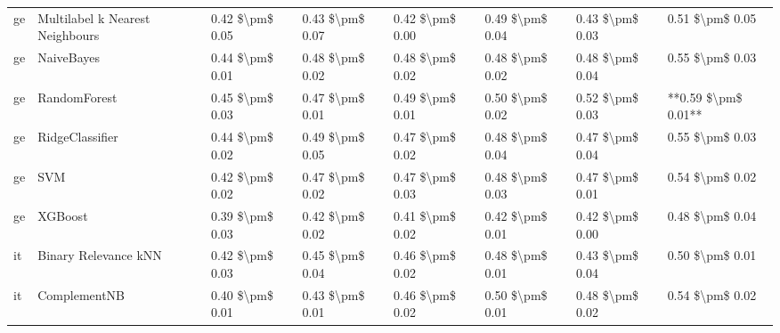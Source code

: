 \begin{tabular}{llllllll}
      ge & Multilabel k Nearest Neighbours & 0.42 \$\textbackslash pm\$ 0.05 &           0.43 \$\textbackslash pm\$ 0.07 &       0.42 \$\textbackslash pm\$ 0.00 &        0.49 \$\textbackslash pm\$ 0.04 &                         0.43 \$\textbackslash pm\$ 0.03 &     0.51 \$\textbackslash pm\$ 0.05 \\
      ge &                      NaiveBayes & 0.44 \$\textbackslash pm\$ 0.01 &           0.48 \$\textbackslash pm\$ 0.02 &       0.48 \$\textbackslash pm\$ 0.02 &        0.48 \$\textbackslash pm\$ 0.02 &                         0.48 \$\textbackslash pm\$ 0.04 &     0.55 \$\textbackslash pm\$ 0.03 \\
      ge &                    RandomForest & 0.45 \$\textbackslash pm\$ 0.03 &           0.47 \$\textbackslash pm\$ 0.01 &       0.49 \$\textbackslash pm\$ 0.01 &        0.50 \$\textbackslash pm\$ 0.02 &                         0.52 \$\textbackslash pm\$ 0.03 & **0.59 \$\textbackslash pm\$ 0.01** \\
      ge &                 RidgeClassifier & 0.44 \$\textbackslash pm\$ 0.02 &           0.49 \$\textbackslash pm\$ 0.05 &       0.47 \$\textbackslash pm\$ 0.02 &        0.48 \$\textbackslash pm\$ 0.04 &                         0.47 \$\textbackslash pm\$ 0.04 &     0.55 \$\textbackslash pm\$ 0.03 \\
      ge &                             SVM & 0.42 \$\textbackslash pm\$ 0.02 &           0.47 \$\textbackslash pm\$ 0.02 &       0.47 \$\textbackslash pm\$ 0.03 &        0.48 \$\textbackslash pm\$ 0.03 &                         0.47 \$\textbackslash pm\$ 0.01 &     0.54 \$\textbackslash pm\$ 0.02 \\
      ge &                         XGBoost & 0.39 \$\textbackslash pm\$ 0.03 &           0.42 \$\textbackslash pm\$ 0.02 &       0.41 \$\textbackslash pm\$ 0.02 &        0.42 \$\textbackslash pm\$ 0.01 &                         0.42 \$\textbackslash pm\$ 0.00 &     0.48 \$\textbackslash pm\$ 0.04 \\
      it &            Binary Relevance kNN & 0.42 \$\textbackslash pm\$ 0.03 &           0.45 \$\textbackslash pm\$ 0.04 &       0.46 \$\textbackslash pm\$ 0.02 &        0.48 \$\textbackslash pm\$ 0.01 &                         0.43 \$\textbackslash pm\$ 0.04 &     0.50 \$\textbackslash pm\$ 0.01 \\
      it &                    ComplementNB & 0.40 \$\textbackslash pm\$ 0.01 &           0.43 \$\textbackslash pm\$ 0.01 &       0.46 \$\textbackslash pm\$ 0.02 &        0.50 \$\textbackslash pm\$ 0.01 &                         0.48 \$\textbackslash pm\$ 0.02 &     0.54 \$\textbackslash pm\$ 0.02 \\

\end{tabular}
